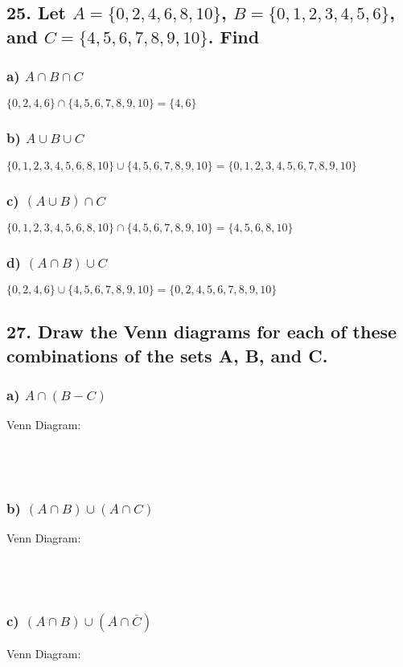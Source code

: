 \documentclass[11pt, oneside]{article} %
\numberwithin{equation}{section} %
\numberwithin{figure}{section} %
\numberwithin{table}{section} %
\begin{document}
\subsection{25. Let $A = \{0,2,4,6,8,10\}$, $B = \{0,1,2,3,4,5,6\}$, and
$C = \{4,5,6,7,8,9,10\}$. Find}
\subsubsection{a) $A\cap B\cap C$}
$\{0,2,4,6\}\cap \{4,5,6,7,8,9,10\} = \{4,6\}$
\subsubsection{b) $A\cup B\cup C$}
$\{0,1,2,3,4,5,6,8,10\} \cup \{4,5,6,7,8,9,10\} = \{0,1,2,3,4,5,6,7,8,9,10\}$
\subsubsection{c) $(A\cup B)\cap C$}
$\{0,1,2,3,4,5,6,8,10\} \cap \{4,5,6,7,8,9,10\} = \{4,5,6,8,10\}$
\subsubsection{d) $(A\cap B)\cup C$}
$\{0,2,4,6\} \cup \{4,5,6,7,8,9,10\} = \{0,2,4,5,6,7,8,9,10\}$

\subsection{27. Draw the Venn diagrams for each of these combinations of the sets A, B, and C.}
\subsubsection{a) $A\cap (B-C)$}
Venn Diagram: \\\\\\\\
\subsubsection{b) $(A\cap B)\cup (A\cap C)$}
Venn Diagram: \\\\\\\\
\subsubsection{c) $(A\cap B)\cup (A\cap\overline{C})$}
Venn Diagram: \\\\\\
\end{document}
